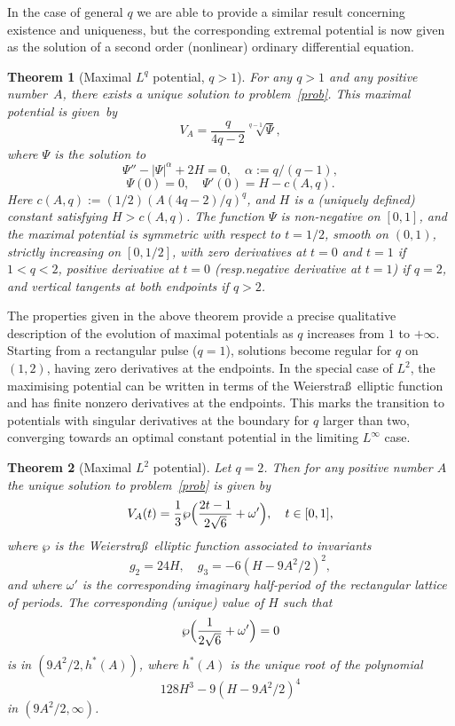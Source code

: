 \documentclass[10pt,a4paper]{amsart}
\providecommand{\resp}{resp.}
\theoremstyle{plain}
\newtheorem{thmx}{Theorem}
\theoremstyle{definition}
\let\balpha q
\begin{document}
In the case of general $\balpha$ we are able to provide a similar result concerning existence and uniqueness, but the corresponding
extremal potential is now given as the solution of a second order (nonlinear) ordinary differential equation.


\begin{thmx}[Maximal $L^\balpha$ potential, $\balpha>1$] \label{thm2}
For any $\balpha>1$ and any positive number~$A$, there exists a unique solution to problem~\eqref{prob}.
This maximal potential is given~by
\[
V_{A} = \frac{\balpha}{4\balpha-2}\sqrt[\balpha-1]{\Psi},
\]
where $\Psi$ is the solution to
\[
\Psi''-|\Psi|^\alpha+2H = 0,\quad \alpha:=\balpha/(\balpha-1),
\]
\[
\Psi(0)=0,\quad \Psi'(0)=H-c(A,\balpha).
\]
Here $c(A,\balpha):=(1/2)(A(4\balpha-2)/\balpha)^\balpha$, and $H$ is a
(uniquely defined) constant satisfying $H>c(A,\balpha)$.
The function $\Psi$ is non-negative on $[0,1]$, and
the maximal potential is symmetric with respect to $t=1/2$, smooth on $(0,1)$,
strictly increasing on $[0,1/2]$,
with zero derivatives at $t=0$ and $t=1$ if $1<\balpha<2$, positive derivative at $t=0$
(\resp negative derivative at $t=1$) if $\balpha=2$, and vertical tangents at both
endpoints if $q>2$.
\end{thmx}


The properties given in the above theorem provide a precise qualitative description of the evolution of maximal potentials as
$q$ increases from $1$ to $+\infty$. Starting from a rectangular pulse ($q=1$), solutions become regular for $q$ on $(1,2)$, having
zero derivatives at the endpoints. In the special case of $L^{2}$, the maximising
potential can be written in terms of the Weierstra\ss\ elliptic function
and has finite nonzero derivatives at the endpoints. This marks the transition to potentials with singular derivatives at the boundary
for $\balpha$ larger than two, converging towards an optimal constant potential in the limiting $L^{\infty}$ case.

\begin{thmx}[Maximal $L^2$ potential] \label{thm3}
Let $\balpha=2$. Then for any positive number $A$ the unique solution to problem~\eqref{prob}
is given by
\[
V_A(t) = \frac{1}{3}\wp\Bigl(\frac{2t-1}{2\sqrt{6}}+\omega'\Bigr),\quad t \in [0,1],
\]
where $\wp$ is the Weierstra\ss\ elliptic function associated to invariants
\[
g_2 = 24 H,\quad g_3 = -6(H-9A^2/2)^2,
\]
and where $\omega'$ is the corresponding
imaginary half-period of the rectangular lattice of
periods. The corresponding (unique) value of $H$ such that
\[
\wp\Bigl(\frac{1}{2\sqrt{6}}+\omega'\Bigr) = 0
\]
is in $(9A^2/2,h^*(A))$, where $h^*(A)$ is the unique root of the polynomial
\[
128 H^3-9(H-9A^2/2)^4
\]
in $(9A^2/2,\infty)$.
\end{thmx}
\end{document}
